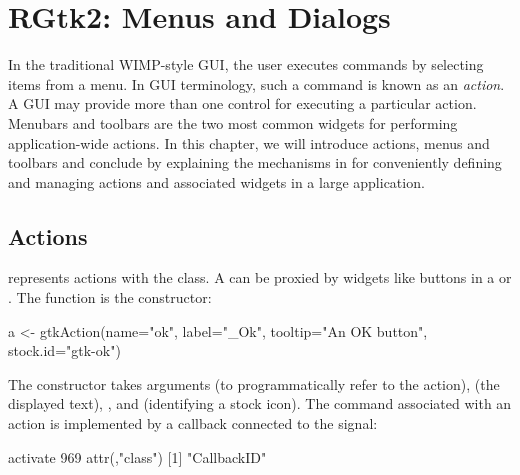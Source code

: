 \chapter{RGtk2: Menus and Dialogs}
\label{sec:RGtk2-menus}


In the traditional WIMP-style GUI, the user executes commands by
selecting items from a menu. In GUI terminology, such a command is
known as an \textit{action}. A GUI may provide more than one control
for executing a particular action. Menubars and toolbars are the two
most common widgets for performing application-wide actions. In this
chapter, we will introduce actions, menus and toolbars and conclude by
explaining the mechanisms in \GTK\/ for conveniently defining and
managing actions and associated widgets in a large application.

\section{Actions}
\label{sec:RGtk2:actions}


\GTK\/ represents actions with the  class. A
 can be proxied by widgets like buttons in a
 or .  The 
function is the constructor:
\begin{Schunk}
\begin{Sinput}
 a <- gtkAction(name="ok", label="_Ok", 
                tooltip="An OK button", stock.id="gtk-ok")
\end{Sinput}
\end{Schunk}
%
The constructor takes arguments  (to
programmatically refer to the action), 
(the displayed text), , and
 (identifying a stock icon).  The
command associated with an action is implemented by a callback
connected to the  signal:
\begin{Schunk}
\begin{Soutput}
activate 
     969 
attr(,"class")
[1] "CallbackID"
\end{Soutput}
\end{Schunk}


